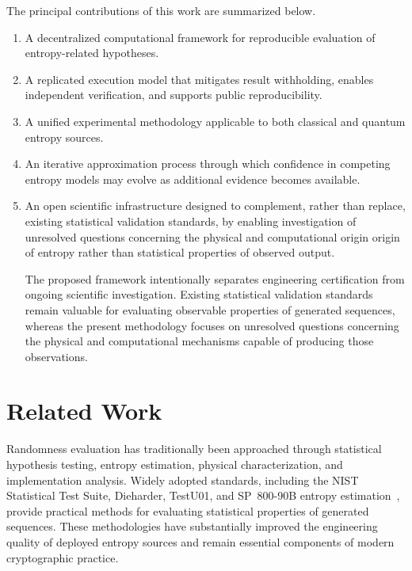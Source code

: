 \documentclass[11pt]{article}
\begin{document}
The principal contributions of this work are summarized below.

\begin{enumerate}[leftmargin=1.2cm]

\item
A decentralized computational framework
for reproducible evaluation of entropy-related hypotheses.

\item
A replicated execution model
that mitigates result withholding,
enables independent verification,
and supports public reproducibility.

\item
A unified experimental methodology
applicable to both classical and quantum entropy sources.

\item
An iterative approximation process
through which confidence in competing entropy models
may evolve as additional evidence becomes available.

\item
An open scientific infrastructure
designed to complement,
rather than replace,
existing statistical validation standards, by enabling investigation of unresolved questions concerning the physical and computational origin origin of entropy rather than statistical properties of observed output.

The proposed framework intentionally separates engineering certification from ongoing scientific investigation. Existing statistical validation standards remain valuable for evaluating observable properties of generated sequences, whereas the present methodology focuses on unresolved questions concerning the physical and computational mechanisms capable of producing those observations.
\end{enumerate}


\section{Related Work}

Randomness evaluation has traditionally been approached through
statistical hypothesis testing,
entropy estimation,
physical characterization,
and implementation analysis.
Widely adopted standards,
including the NIST Statistical Test Suite,
Dieharder,
TestU01,
and SP~800-90B entropy estimation~\cite{nist80090b},
provide practical methods for evaluating statistical properties
of generated sequences.
These methodologies have substantially improved
the engineering quality of deployed entropy sources
and remain essential components of modern cryptographic practice.
\end{document}
